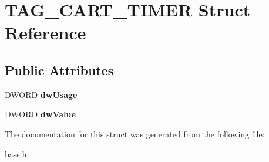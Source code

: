 \hypertarget{structTAG__CART__TIMER}{}\section{T\+A\+G\+\_\+\+C\+A\+R\+T\+\_\+\+T\+I\+M\+E\+R Struct Reference}
\label{structTAG__CART__TIMER}
\subsection*{Public Attributes}
\begin{DoxyCompactItemize}
\item 
\hypertarget{structTAG__CART__TIMER_aa40808e77b3759fe9126c02f027271d9}{}D\+W\+O\+R\+D {\bfseries dw\+Usage}\label{structTAG__CART__TIMER_aa40808e77b3759fe9126c02f027271d9}

\item 
\hypertarget{structTAG__CART__TIMER_aa5bbaed34d05a4febf635a1a46fe72b0}{}D\+W\+O\+R\+D {\bfseries dw\+Value}\label{structTAG__CART__TIMER_aa5bbaed34d05a4febf635a1a46fe72b0}

\end{DoxyCompactItemize}


The documentation for this struct was generated from the following file\+:\begin{DoxyCompactItemize}
\item 
bass.\+h\end{DoxyCompactItemize}
